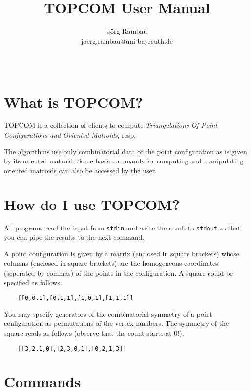 \documentclass[12pt,a4paper]{article}
\title{TOPCOM User Manual}
\author{J\"org Rambau\\
  joerg.rambau@uni-bayreuth.de}
\begin{document}
\maketitle

\begin{verbatim}
\end{verbatim}


\section{What is TOPCOM?}
\label{sec:whatis}

TOPCOM is a collection of clients to compute \emph{Triangulations Of Point
Configurations and Oriented Matroids}, resp.

The algorithms use only combinatorial data of the point configuration as is
given by its oriented matroid.  Some basic commands for computing and
manipulating oriented matroids can also be accessed by the user.


\section{How do I use TOPCOM?}
\label{sec:howto}

All programs read the input from \texttt{stdin} and write the result to
\texttt{stdout} so that you can pipe the results to the next command.

A point configuration is given by a matrix (enclosed in square brackets) whose
columns (enclosed in square brackets) are the homogeneous coordinates
(seperated by commas) of the points in the configuration.  A square could be
specified as follows.

\begin{verbatim}
    [[0,0,1],[0,1,1],[1,0,1],[1,1,1]]
\end{verbatim}

You may specify generators of the combinatorial symmetry of a point
configuration as permutations of the vertex numbers. The symmetry of the square
reads as follows (observe that the count starts at 0!):

\begin{verbatim}
    [[3,2,1,0],[2,3,0,1],[0,2,1,3]]
\end{verbatim}

\section{Commands}
\label{sec:commands}
\end{document}
